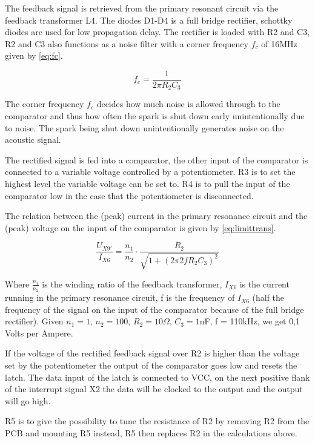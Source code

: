 The feedback signal is retrieved from the primary resonant circuit via the feedback transformer L4. The diodes D1-D4 is a full bridge rectifier, schottky diodes are used for low propagation delay. The rectifier is loaded with R2 and C3, R2 and C3 also functions as a noise filter with a corner frequency $f_c$ of 16MHz given by \cref{eq:fc}.

\begin{equation} \label{eq:fc}
    f_c = \frac{1}{2 \pi R_2 C_3}
\end{equation}

The corner frequency $f_c$ decides how much noise is allowed through to the comparator and thus how often the spark is shut down early unintentionally due to noise. The spark being shut down unintentionally generates noise on the acoustic signal.

The rectified signal is fed into a comparator, the other input of the comparator is connected to a variable voltage controlled by a potentiometer. R3 is to set the highest level the variable voltage can be set to. R4 is to pull the input of the comparator low in the case that the potentiometer is disconnected.

The relation between the (peak) current in the primary resonance circuit and the (peak) voltage on the input of the comparator is given by \cref{eq:limittrans}.

\begin{equation} \label{eq:limittrans}
    \frac{U_{X9'}}{I_{X6}} = \frac{n_1}{n_2} \cdot \frac{R_2}{\sqrt{1+(2 \pi 2 f R_2 C_3)^2}}
\end{equation}


Where $\frac{n_1}{n_2}$ is the winding ratio of the feedback transformer, $I_{X6}$ is the current running in the primary resonance circuit, f is the frequency of $I_{X6}$ (half the frequency of the signal on the input of the comparator because of the full bridge rectifier). Given $n_1 = 1$, $n_2 = 100$, $R_2 = 10\Omega$, $C_3 = 1$nF, f = 110kHz, we get 0,1 Volts per Ampere.

If the voltage of the rectified feedback signal over R2 is higher than the voltage set by the potentiometer the output of the comparator goes low and resets the latch. The data input of the latch is connected to VCC, on the next positive flank of the interrupt signal X2 the data will be clocked to the output and the output will go high.

R5 is to give the possibility to tune the resistance of R2 by removing R2 from the PCB and mounting R5 instead, R5 then replaces R2 in the calculations above.

